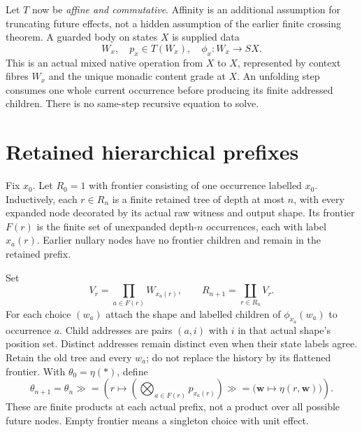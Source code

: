 \documentclass[11pt]{article}
\begin{document}
Let $T$ now be \emph{affine and commutative}. Affinity is an additional assumption for truncating future effects, not a hidden assumption of the earlier finite crossing theorem. A guarded body on states $X$ is supplied data
\[
 W_x,\quad p_x\in T(W_x),\quad
 \phi_x:W_x\longrightarrow SX.
\]
This is an actual mixed native operation from $X$ to $X$, represented by context fibres $W_x$ and the unique monadic content grade at $X$. An unfolding step consumes one whole current occurrence before producing its finite addressed children. There is no same-step recursive equation to solve.

\section{Retained hierarchical prefixes}
Fix $x_0$. Let $R_0=1$ with frontier consisting of one occurrence labelled $x_0$. Inductively, each $r\in R_n$ is a finite retained tree of depth at most $n$, with every expanded node decorated by its actual raw witness and output shape. Its frontier $F(r)$ is the finite set of unexpanded depth-$n$ occurrences, each with label $x_a(r)$. Earlier nullary nodes have no frontier children and remain in the retained prefix.

Set
\[
 V_r=\prod_{a\in F(r)}W_{x_a(r)},\qquad
 R_{n+1}=\coprod_{r\in R_n}V_r.
\]
For each choice $(w_a)$ attach the shape and labelled children of $\phi_{x_a}(w_a)$ to occurrence $a$. Child addresses are pairs $(a,i)$ with $i$ in that actual shape's position set. Distinct addresses remain distinct even when their state labels agree. Retain the old tree and every $w_a$; do not replace the history by its flattened frontier. With $\theta_0=\eta(*)$, define
\[
 \theta_{n+1}=\theta_n\gg=
 \left(r\mapsto \left(\bigotimes_{a\in F(r)}p_{x_a(r)}\right)
 \gg=\bigl(\mathbf w\mapsto\eta(r,\mathbf w)\bigr)\right).
\tag{P}
\]
These are finite products at each actual prefix, not a product over all possible future nodes. Empty frontier means a singleton choice with unit effect.
\end{document}
